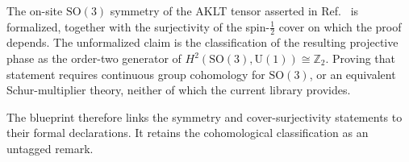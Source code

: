 \documentclass[11pt]{article}
\begin{document}
The on-site $\mathrm{SO}(3)$ symmetry of the AKLT tensor asserted in
Ref.~\cite{Cirac2021Matrix} is formalized, together with the surjectivity of
the spin-$\tfrac{1}{2}$ cover on which the proof depends. The unformalized
claim is the classification of the resulting projective phase as the
order-two generator of
$H^2(\mathrm{SO}(3),\mathrm{U}(1))\cong\mathbb{Z}_2$. Proving that statement
requires continuous group cohomology for $\mathrm{SO}(3)$, or an equivalent
Schur-multiplier theory, neither of which the current library provides.

The blueprint therefore links the symmetry and cover-surjectivity statements
to their formal declarations. It retains the cohomological classification as
an untagged remark.



\end{document}
